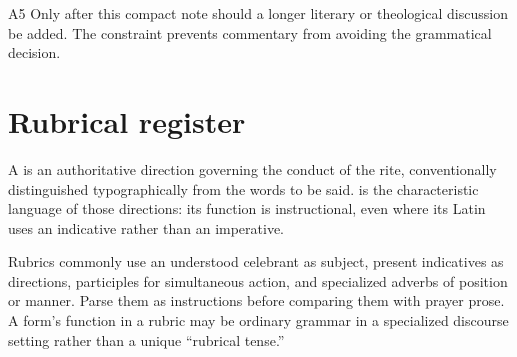 \begin{courseunit}{A5}
Only after this compact note should a longer literary or theological discussion
be added. The constraint prevents commentary from avoiding the grammatical
decision.

\section{Rubrical register}

A  is an authoritative direction governing the conduct of the
rite, conventionally distinguished typographically from the words to be said.
 is the characteristic language of those directions:
its function is instructional, even where its Latin uses an indicative rather
than an imperative.

Rubrics commonly use an understood celebrant as subject, present indicatives as
directions, participles for simultaneous action, and specialized adverbs of
position or manner. Parse them as instructions before comparing them with
prayer prose. A form's function in a rubric may be ordinary grammar in a
specialized discourse setting rather than a unique ``rubrical tense.''



\end{courseunit}

